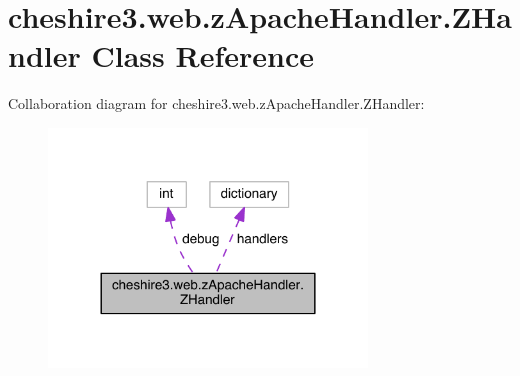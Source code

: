 \hypertarget{classcheshire3_1_1web_1_1z_apache_handler_1_1_z_handler}{\section{cheshire3.\-web.\-z\-Apache\-Handler.\-Z\-Handler Class Reference}
\label{classcheshire3_1_1web_1_1z_apache_handler_1_1_z_handler}
}


Collaboration diagram for cheshire3.\-web.\-z\-Apache\-Handler.\-Z\-Handler\-:
\nopagebreak
\begin{figure}[H]
\begin{center}
\leavevmode
\includegraphics[width=240pt]{classcheshire3_1_1web_1_1z_apache_handler_1_1_z_handler__coll__graph}
\end{center}
\end{figure}
